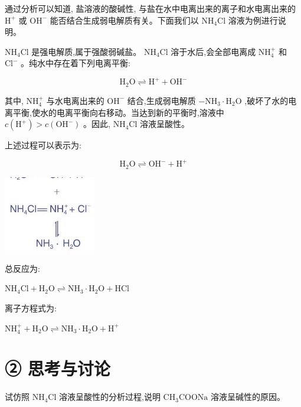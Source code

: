 \documentclass[10pt]{article}
\begin{document}
通过分析可以知道, 盐溶液的酸碱性, 与盐在水中电离出来的离子和水电离出来的 \({\mathrm{H}}^{ + }\) 或 \({\mathrm{{OH}}}^{ - }\) 能否结合生成弱电解质有关。下面我们以 \({\mathrm{{NH}}}_{4}\mathrm{{Cl}}\) 溶液为例进行说明。

\({\mathrm{{NH}}}_{4}\mathrm{{Cl}}\) 是强电解质,属于强酸弱碱盐。 \({\mathrm{{NH}}}_{4}\mathrm{{Cl}}\) 溶于水后,会全部电离成 \({\mathrm{{NH}}}_{4}^{ + }\) 和 \({\mathrm{{Cl}}}^{ - }\) 。纯水中存在着下列电离平衡:

\[
{\mathrm{H}}_{2}\mathrm{O} \rightleftharpoons {\mathrm{H}}^{ + } + {\mathrm{{OH}}}^{ - }
\]

其中, \({\mathrm{{NH}}}_{4}^{ + }\) 与水电离出来的 \({\mathrm{{OH}}}^{ - }\) 结合,生成弱电解质 \(- {\mathrm{{NH}}}_{3} \cdot {\mathrm{H}}_{2}\mathrm{O}\) ,破坏了水的电离平衡,使水的电离平衡向右移动。当达到新的平衡时,溶液中 \(c\left( {\mathrm{H}}^{ + }\right) > c\left( {\mathrm{{OH}}}^{ - }\right)\) 。因此, \({\mathrm{{NH}}}_{4}\mathrm{{Cl}}\) 溶液呈酸性。

上述过程可以表示为:

\[
{\mathrm{H}}_{2}\mathrm{O} \rightleftharpoons {\mathrm{{OH}}}^{ - } + {\mathrm{H}}^{ + }
\]

\begin{center}
\includegraphics[max width=0.3\textwidth]{images/0190da9d-8bfd-732f-bc2c-0b21d0f13b91_78_163511.jpg}
\end{center}

总反应为:

\({\mathrm{{NH}}}_{4}\mathrm{{Cl}} + {\mathrm{H}}_{2}\mathrm{O} \rightleftharpoons {\mathrm{{NH}}}_{3} \cdot {\mathrm{H}}_{2}\mathrm{O} + \mathrm{{HCl}}\)

离子方程式为:

\({\mathrm{{NH}}}_{4}^{ + } + {\mathrm{H}}_{2}\mathrm{O} \rightleftharpoons {\mathrm{{NH}}}_{3} \cdot {\mathrm{H}}_{2}\mathrm{O} + {\mathrm{H}}^{ + }\)

\section*{② 思考与讨论}

试仿照 \({\mathrm{{NH}}}_{4}\mathrm{{Cl}}\) 溶液呈酸性的分析过程,说明 \({\mathrm{{CH}}}_{3}\mathrm{{COONa}}\) 溶液呈碱性的原因。
\end{document}
